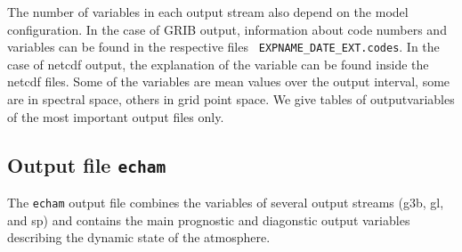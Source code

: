The number of variables in each output stream also depend on the model
configuration. In the case of GRIB output, information about code
numbers and variables can be found in the respective files {\tt
  EXPNAME\_DATE\_EXT.codes}. In the case of netcdf output, the
explanation of the variable can be found inside the netcdf files.
Some of the variables are mean values over the output interval, some
are in spectral space, others in grid point space.
We give tables of outputvariables of the most important output files only.

\subsection{Output file {\tt echam}}

The {\tt echam} output file combines the variables of several output
streams (g3b, gl, and sp) and contains the main prognostic and
diagonstic \echam{} 
output variables describing the dynamic state of the atmosphere.

\setlength{\LTcapwidth}{\textwidth}
\setlength{\LTleft}{0pt}\setlength{\LTright}{0pt}

